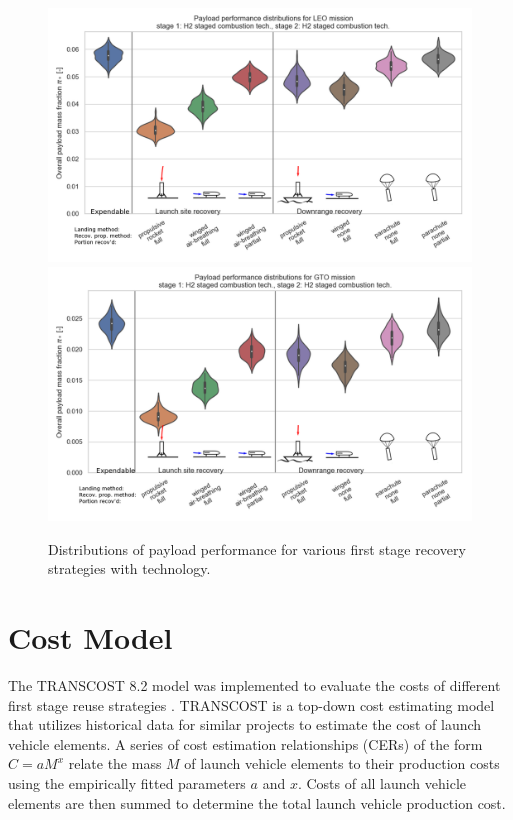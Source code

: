 \documentclass[conf]{new-aiaa}
\begin{document}
\begin{multicols}{2}
\begin{figure}
    \centering
    \includegraphics[width=\textwidth]{strategy_perf_annotated/LEO_H2}
    \includegraphics[width=\textwidth]{strategy_perf_annotated/GTO_H2}
    \caption{\label{fig:strategy_perf_H2} Distributions of payload performance for various first stage recovery strategies with  technology.}
\end{figure}

\section{Cost Model}

The TRANSCOST 8.2 model was implemented to evaluate the costs of different first stage reuse strategies \cite{transcost}. TRANSCOST is a top-down cost estimating model that utilizes historical data for similar projects to estimate the cost of launch vehicle elements. A series of cost estimation relationships (CERs) of the form $C = a M^x$ relate the mass $M$ of launch vehicle elements to their production costs using the empirically fitted parameters $a$ and $x$. Costs of all launch vehicle elements are then summed to determine the total launch vehicle production cost. 


\end{multicols}
\end{document}
